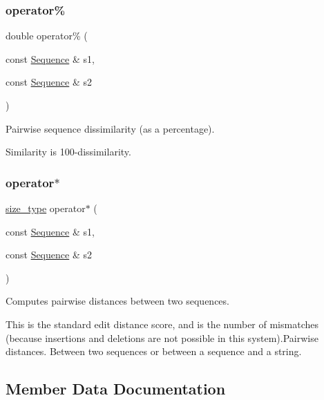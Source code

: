 \subsubsection{\texorpdfstring{operator\%}{operator\%}}
{\footnotesize\ttfamily double operator\% (\begin{DoxyParamCaption}\item[{const \hyperlink{classretrocombinator_1_1Sequence}{Sequence} \&}]{s1,  }\item[{const \hyperlink{classretrocombinator_1_1Sequence}{Sequence} \&}]{s2 }\end{DoxyParamCaption})\hspace{0.3cm}{\ttfamily [friend]}}



Pairwise sequence dissimilarity (as a percentage). 

Similarity is 100-\/dissimilarity. \mbox{\label{classretrocombinator_1_1Sequence_a8cd9dc2cfea97399387e2876ee028c32}} 
\subsubsection{\texorpdfstring{operator$\ast$}{operator*}}
{\footnotesize\ttfamily \hyperlink{constants_8h_a8e1541b50cee66a791df4c437ccbb385}{size\+\_\+type} operator$\ast$ (\begin{DoxyParamCaption}\item[{const \hyperlink{classretrocombinator_1_1Sequence}{Sequence} \&}]{s1,  }\item[{const \hyperlink{classretrocombinator_1_1Sequence}{Sequence} \&}]{s2 }\end{DoxyParamCaption})\hspace{0.3cm}{\ttfamily [friend]}}



Computes pairwise distances between two sequences. 

This is the standard edit distance score, and is the number of mismatches (because insertions and deletions are not possible in this system).Pairwise distances. Between two sequences or between a sequence and a string. 

\subsection{Member Data Documentation}
\mbox{\label{classretrocombinator_1_1Sequence_a7c6072eaff9990a0bcaebcfa6287e3e0}} 
